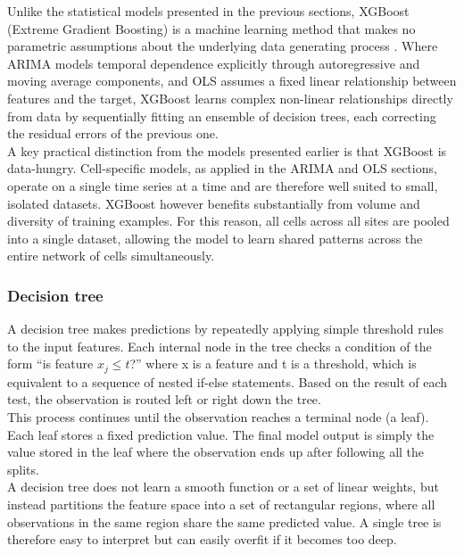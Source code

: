 Unlike the statistical models presented in the previous sections, XGBoost (Extreme Gradient Boosting) is a machine learning method that makes no parametric assumptions about the underlying data generating process \cite{XG_paper}. Where ARIMA models temporal dependence explicitly through autoregressive and moving average components, and OLS assumes a fixed linear relationship between features and the target, XGBoost learns complex non-linear relationships directly from data by sequentially fitting an ensemble of decision trees, each correcting the residual errors of the previous one. \\

A key practical distinction from the models presented earlier is that XGBoost is data-hungry. Cell-specific models, as applied in the ARIMA and OLS sections, operate on a single time series at a time and are therefore well suited to small, isolated datasets. XGBoost however benefits substantially from volume and diversity of training examples. For this reason, all cells across all sites are pooled into a single dataset, allowing the model to learn shared patterns across the entire network of cells simultaneously. \\

\subsubsection{Decision tree}
A decision tree makes predictions by repeatedly applying simple threshold rules to the input features. Each internal node in the tree checks a condition of the form “is feature $x_j \leq t$?” where x is a feature and t is a threshold, which is equivalent to a sequence of nested if-else statements. Based on the result of each test, the observation is routed left or right down the tree. \\

This process continues until the observation reaches a terminal node (a leaf). Each leaf stores a fixed prediction value. The final model output is simply the value stored in the leaf where the observation ends up after following all the splits. \\

A decision tree does not learn a smooth function or a set of linear weights, but instead partitions the feature space into a set of rectangular regions, where all observations in the same region share the same predicted value. A single tree is therefore easy to interpret but can easily overfit if it becomes too deep. \\


